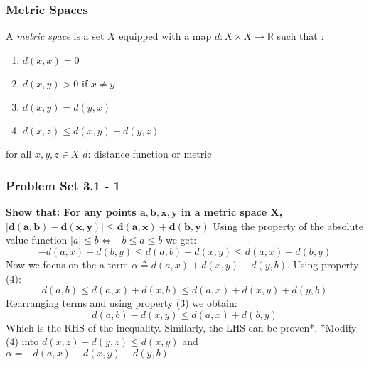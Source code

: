 \begin{frame}
    \frametitle{Metric Spaces}
A \textit{metric space} is a set $X$ equipped with a map $d: X\times X
\rightarrow \mathbb{R}$ such that :
\begin{enumerate}
    \item $d(x,x) = 0$
    \item $d(x,y)>0$ if $x\neq y$
    \item $d(x,y) = d(y,x)$
    \item $d(x,z) \leq d(x,y)+d(y,z)$
\end{enumerate}
    
for all $x,y,z \in X$ \hfill\break
\hfill\break
$d$: distance function or metric
\end{frame}

\begin{frame}
\frametitle{Problem Set 3.1 - 1}
\textbf{Show that: For any points $\bm{a,b,x,y}$ in a metric space X,}
$\bm{|d(a,b) - d(x,y)| \leq d(a,x) + d(b,y)}$\hfill\break
\hfill\break
Using the property of the absolute value function $|a|\leq b \iff -b\leq a \leq
b$ we get:\hfill\break
\begin{equation*}
- d(a,x) - d(b,y) \leq d(a,b) - d(x,y) \leq  d(a,x) + d(b,y)
\end{equation*}
\hfill\break
Now we focus on the a term $\alpha \triangleq d(a,x) + d(x, y)  + d(y, b)$.
Using property (4):
\begin{equation*}
d(a,b) \leq d(a,x) + d(x, b) \leq  d(a,x) + d(x, y)  + d(y, b) 
\end{equation*}
Rearranging terms and using property (3) we obtain:
\begin{equation*}
d(a,b) - d(x,y) \leq  d(a,x) + d(b,y)
\end{equation*}
Which is the RHS of the inequality. Similarly, the LHS can be proven*.
\hfill\break
*Modify (4) into $d(x,z) - d(y,z) \leq d(x,y)$ and $\alpha = -d(a,x) -d(x, y)  +
d(y, b)$
\end{frame}

